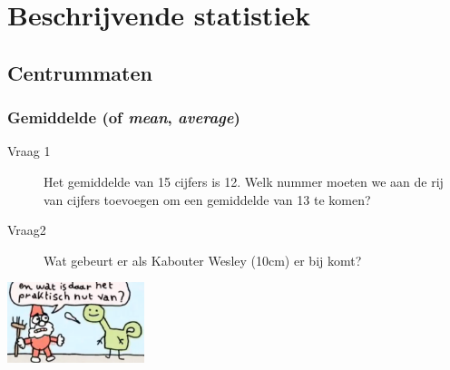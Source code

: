 \documentclass{beamer}
\begin{document}
\begin{frame}
\end{frame}

\section{Beschrijvende statistiek}

\subsection{Centrummaten}


\begin{frame}
  \frametitle{Gemiddelde (of \emph{mean}, \emph{average})}


  

  \vspace{.5cm}
  \begin{description}
    \item[Vraag 1] Het gemiddelde van 15 cijfers is 12. Welk nummer moeten we aan de rij van cijfers toevoegen om een gemiddelde van 13 te komen?
    \item[Vraag2] Wat gebeurt er als Kabouter Wesley (10cm) er bij komt?
  \end{description}

  \hfill \includegraphics[width=4cm]{img/les2-hero-6}

\end{frame}
\end{document}
